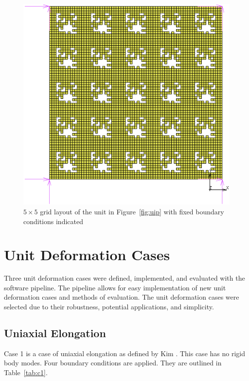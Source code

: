 \begin{figure}[H]
	\centering
	\includegraphics[width=\textwidth]{5x5Layout.png}
	\caption[$5\times 5$ grid layout with fixed boundary conditions indicated]{$5\times 5$ grid layout of the unit in Figure~\ref{fig:uip} with fixed boundary conditions indicated}
	\label{fig:5x5grid}
\end{figure}

\section{Unit Deformation Cases}
\label{sec:UC}

Three unit deformation cases were defined, implemented, and evaluated with the software pipeline. The pipeline allows for easy implementation of new unit deformation cases and methods of evaluation. The unit deformation cases were selected due to their robustness, potential applications, and simplicity.

\subsection{Uniaxial Elongation}

Case 1 is a case of uniaxial elongation as defined by Kim \citep{Kim2015}. This case has no rigid body modes. Four boundary conditions are applied. They are outlined in Table~\ref{tab:c1}.

